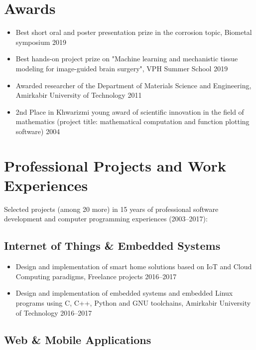 \documentclass{cv}
\begin{document}

\section{Awards}

\begin{itemize}
\item
Best short oral and poster presentation prize in the corrosion topic, Biometal symposium \hfill 2019
\item
Best hands-on project prize on "Machine learning and mechanistic tissue modeling for image-guided brain surgery", VPH Summer School \hfill 2019
\item
Awarded researcher of the Department of Materials Science and Engineering, Amirkabir University of Technology \hfill 2011
\item
2nd Place in Khwarizmi young award of scientific innovation in the field of mathematics (project title: mathematical computation and function plotting software) \hfill 2004
\end{itemize}



\section{Professional Projects and Work Experiences}


Selected projects (among 20 more) in 15 years of professional software development and computer programming experiences (2003--2017):

\subsection{Internet of Things \& Embedded Systems}

\begin{itemize}

\item
Design and implementation of smart home solutions based on IoT and Cloud Computing paradigms, Freelance projects \hfill 2016--2017
\item
Design and implementation of embedded systems and embedded Linux programs using C, C++, Python and GNU toolchains, Amirkabir University of Technology \hfill 2016--2017

\end{itemize}


\subsection{Web \& Mobile Applications}
\end{document}
